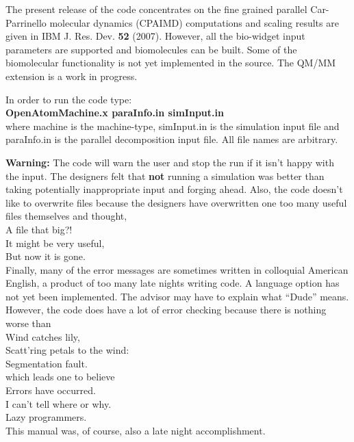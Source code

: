 \documentclass[12pt]{article}
\begin{document}
The present release of the code concentrates on the fine grained
parallel Car-Parrinello molecular dynamics (CPAIMD) computations 
and scaling results are given in IBM J. Res. Dev. {\bf 52} (2007). 
However, all the 
bio-widget input parameters are supported and biomolecules can be
built. Some of the biomolecular functionality is not yet implemented
in the source. The QM/MM extension is a work in progress.

In order to run the code type: \\
\hspace*{1.5in} {\bf OpenAtomMachine.x paraInfo.in simInput.in} \\
where machine is the machine-type, simInput.in is the simulation input
file and paraInfo.in is the parallel decomposition input file. 
All file names are arbitrary.

{\bf Warning:} The code will warn the user and stop the run if it isn't happy
with the input. The designers felt that {\bf not} running a
simulation was better than taking potentially inappropriate input 
and forging ahead. 
Also, the code doesn't like to overwrite files because the designers
have overwritten one too many useful files themselves and thought,  \\
\hspace*{1.25in}  A file that big?! \\
\hspace*{1.25in}  It might be very useful,\\
\hspace*{1.25in}  But now it is gone.\\
Finally, many of the error messages are sometimes written in colloquial American English, 
a product of too many late nights writing code. A language option has
not yet been implemented. The advisor may have to explain what
``Dude'' means.  However, the code does have a lot of error
checking because there is nothing worse than \\
\hspace*{1.25in}    Wind catches lily, \\
\hspace*{1.25in}    Scatt'ring petals to the wind:\\
\hspace*{1.25in}    Segmentation fault.\\
which leads one to believe \\
\hspace*{1.25in}  Errors have occurred. \\
\hspace*{1.25in}  I can't tell where or why.\\
\hspace*{1.25in}  Lazy programmers.\\
This manual was, of course, also a late night accomplishment.
\end{document}
